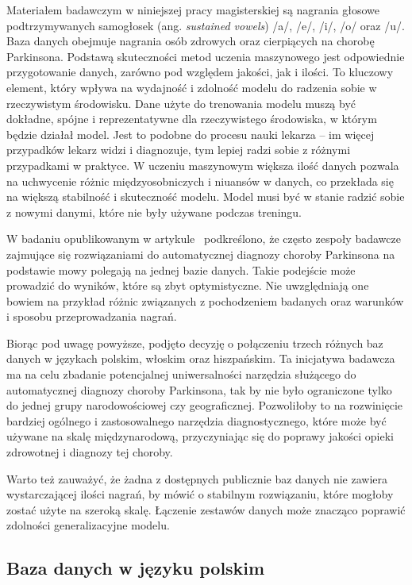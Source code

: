 Materiałem badawczym w niniejszej pracy magisterskiej są nagrania głosowe podtrzymywanych samogłosek (ang. \emph{sustained vowels}) /a/, /e/, /i/, /o/ oraz /u/.
Baza danych obejmuje nagrania osób zdrowych oraz cierpiących na chorobę Parkinsona.
Podstawą skuteczności metod uczenia maszynowego jest odpowiednie przygotowanie danych, zarówno pod względem jakości, jak i ilości.
To kluczowy element, który wpływa na wydajność i zdolność modelu do radzenia sobie w rzeczywistym środowisku.
Dane użyte do trenowania modelu muszą być dokładne, spójne i reprezentatywne dla rzeczywistego środowiska, w którym będzie działał model.
Jest to podobne do procesu nauki lekarza – im więcej przypadków lekarz widzi i diagnozuje, tym lepiej radzi sobie z różnymi przypadkami w praktyce.
W  uczeniu maszynowym większa ilość danych pozwala na uchwycenie różnic międzyosobniczych i niuansów w danych, co przekłada się na większą stabilność i skuteczność modelu.
Model musi być w stanie radzić sobie z nowymi danymi, które nie były używane podczas treningu.

W badaniu opublikowanym w artykule~\cite{SustainedVowelsProblems} podkreślono, że często zespoły badawcze zajmujące się rozwiązaniami do automatycznej diagnozy choroby Parkinsona na podstawie mowy polegają na jednej bazie danych.
Takie podejście może prowadzić do wyników, które są zbyt optymistyczne.
Nie uwzględniają one bowiem na przykład różnic związanych z pochodzeniem badanych oraz warunków i sposobu przeprowadzania nagrań.

Biorąc pod uwagę powyższe, podjęto decyzję o połączeniu trzech różnych baz danych w językach polskim, włoskim oraz hiszpańskim.
Ta inicjatywa badawcza ma na celu zbadanie potencjalnej uniwersalności narzędzia służącego do automatycznej diagnozy choroby Parkinsona, tak by nie było ograniczone tylko do jednej grupy narodowościowej czy geograficznej.
Pozwoliłoby to na rozwinięcie bardziej ogólnego i zastosowalnego narzędzia diagnostycznego, które może być używane na skalę międzynarodową, przyczyniając się do poprawy jakości opieki zdrowotnej i diagnozy tej choroby.

Warto też zauważyć, że żadna z dostępnych publicznie baz danych nie zawiera wystarczającej ilości nagrań, by mówić o stabilnym rozwiązaniu, które mogłoby zostać użyte na szeroką skalę.
Łączenie zestawów danych może znacząco poprawić zdolności generalizacyjne modelu.

\subsection{Baza danych w języku polskim}
\label{subsec:polska-baza}

